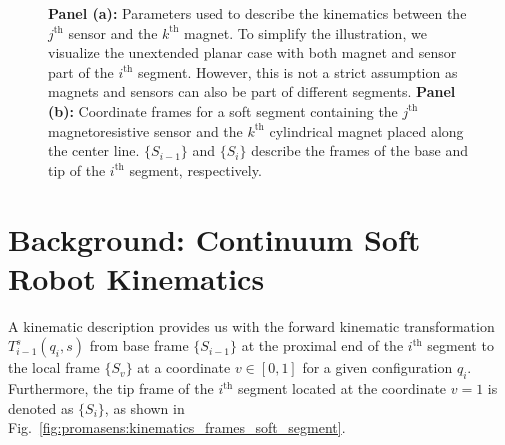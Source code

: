 \begin{figure}[t]
\centering
{}
\caption{\textbf{Panel (a):} Parameters used to describe the kinematics between the $j^\mathrm{th}$ sensor and the $k^\mathrm{th}$ magnet. To simplify the illustration, we visualize the unextended planar case with both magnet and sensor part of the $i^\mathrm{th}$ segment. However, this is not a strict assumption as magnets and sensors can also be part of different segments. \textbf{Panel (b):} Coordinate frames for a soft segment containing the $j^\mathrm{th}$ magnetoresistive sensor and the $k^\mathrm{th}$ cylindrical magnet placed along the center line. $\{S_{i-1}\}$ and $\{S_{i}\}$ describe the frames of the base and tip of the $i^\mathrm{th}$ segment, respectively.}
\end{figure}

\section{Background: Continuum Soft Robot Kinematics}\label{sec:promasens:kinematics}
A kinematic description provides us with the forward kinematic transformation $T_{i-1}^s(q_i,s)$ from base frame $\{S_{i-1}\}$ at the proximal end of the $i^\mathrm{th}$ segment to the local frame $\{S_{v}\}$ at a coordinate $v \in [0,1]$ for a given configuration $q_i$. Furthermore, the tip frame of the $i^\mathrm{th}$ segment located at the coordinate $v = 1$ is denoted as $\{S_{i}\}$, as shown in Fig.~\ref{fig:promasens:kinematics_frames_soft_segment}.

